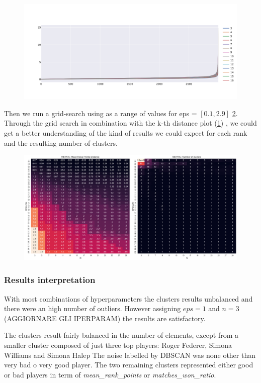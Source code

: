 \documentclass{article}
\begin{document}
\begin{figure}[h]
\centering
\includegraphics[width=\textwidth]{plots/dbscan/dbscan_distances}
\label{fig:dbscan_distances}
\end{figure}

Then we run a grid-search using as a range of values for eps = $[0.1, 2.9]$ \ref{fig:dbscan_metrics}. Through the grid search in combination with the k-th distance plot (\ref{fig:dbscan_distances}) , we could get a better understanding of the kind of results we could expect for each rank and the resulting number of clusters.

\begin{figure}[h]
\centering
\includegraphics[width=.6\textwidth]{plots/dbscan/dbscan_metrics}
\label{fig:dbscan_metrics}
\end{figure}

\subsubsection{Results interpretation}
With most combinations of hyperparameters the clusters results unbalanced and there were an high number of outliers.
However assigning $eps=1$ and $n=3$ (AGGIORNARE GLI IPERPARAM) the results are satisfactory.

The clusters result fairly balanced in the number of elements, except from a smaller cluster composed of just three top players: Roger Federer, Simona Williams and Simona Halep
The noise labelled by DBSCAN was none other than very bad o very good player.
The two remaining clusters represented either good or bad players in term of \textit{mean\_rank\_points} or \textit{matches\_won\_ratio}.
\end{document}
